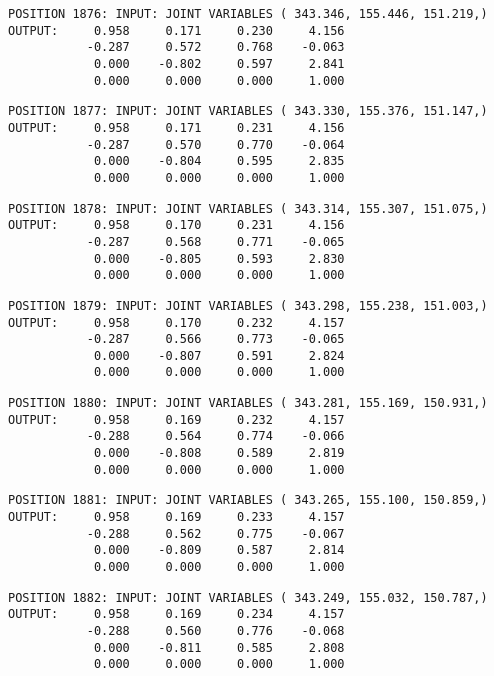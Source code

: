 \begin{verbatim}
POSITION 1876: INPUT: JOINT VARIABLES ( 343.346, 155.446, 151.219,)
OUTPUT:     0.958     0.171     0.230     4.156
           -0.287     0.572     0.768    -0.063
            0.000    -0.802     0.597     2.841
            0.000     0.000     0.000     1.000
\end{verbatim} \pagebreak[1]\begin{verbatim}
POSITION 1877: INPUT: JOINT VARIABLES ( 343.330, 155.376, 151.147,)
OUTPUT:     0.958     0.171     0.231     4.156
           -0.287     0.570     0.770    -0.064
            0.000    -0.804     0.595     2.835
            0.000     0.000     0.000     1.000
\end{verbatim} \pagebreak[1]\begin{verbatim}
POSITION 1878: INPUT: JOINT VARIABLES ( 343.314, 155.307, 151.075,)
OUTPUT:     0.958     0.170     0.231     4.156
           -0.287     0.568     0.771    -0.065
            0.000    -0.805     0.593     2.830
            0.000     0.000     0.000     1.000
\end{verbatim} \pagebreak[1]\begin{verbatim}
POSITION 1879: INPUT: JOINT VARIABLES ( 343.298, 155.238, 151.003,)
OUTPUT:     0.958     0.170     0.232     4.157
           -0.287     0.566     0.773    -0.065
            0.000    -0.807     0.591     2.824
            0.000     0.000     0.000     1.000
\end{verbatim} \pagebreak[1]\begin{verbatim}
POSITION 1880: INPUT: JOINT VARIABLES ( 343.281, 155.169, 150.931,)
OUTPUT:     0.958     0.169     0.232     4.157
           -0.288     0.564     0.774    -0.066
            0.000    -0.808     0.589     2.819
            0.000     0.000     0.000     1.000
\end{verbatim} \pagebreak[1]\begin{verbatim}
POSITION 1881: INPUT: JOINT VARIABLES ( 343.265, 155.100, 150.859,)
OUTPUT:     0.958     0.169     0.233     4.157
           -0.288     0.562     0.775    -0.067
            0.000    -0.809     0.587     2.814
            0.000     0.000     0.000     1.000
\end{verbatim} \pagebreak[1]\begin{verbatim}
POSITION 1882: INPUT: JOINT VARIABLES ( 343.249, 155.032, 150.787,)
OUTPUT:     0.958     0.169     0.234     4.157
           -0.288     0.560     0.776    -0.068
            0.000    -0.811     0.585     2.808
            0.000     0.000     0.000     1.000
\end{verbatim} \pagebreak[1]\begin{verbatim}

\end{verbatim}

